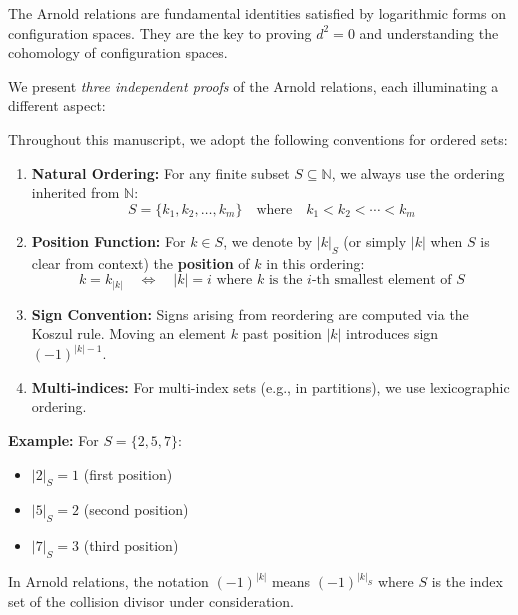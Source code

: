 The Arnold relations are fundamental identities satisfied by logarithmic forms on configuration spaces. They are the key to proving $d^2 = 0$ and understanding the cohomology of configuration spaces.

We present \emph{three independent proofs} of the Arnold relations, each illuminating a different aspect:

\begin{convention}\label{conv:set-ordering-arnold}
Throughout this manuscript, we adopt the following conventions for ordered sets:

\begin{enumerate}
\item \textbf{Natural Ordering:} For any finite subset $S \subseteq \mathbb{N}$, 
we always use the ordering inherited from $\mathbb{N}$:
$$S = \{k_1, k_2, \ldots, k_m\} \quad \text{where} \quad k_1 < k_2 < \cdots < k_m$$

\item \textbf{Position Function:} For $k \in S$, we denote by $|k|_S$ (or simply $|k|$ 
when $S$ is clear from context) the \textbf{position} of $k$ in this ordering:
$$k = k_{|k|} \quad \iff \quad |k| = i \text{ where } k \text{ is the } i\text{-th smallest element of } S$$

\item \textbf{Sign Convention:} Signs arising from reordering are computed via the 
Koszul rule. Moving an element $k$ past position $|k|$ introduces sign $(-1)^{|k|-1}$.

\item \textbf{Multi-indices:} For multi-index sets (e.g., in partitions), we use 
lexicographic ordering.
\end{enumerate}

\textbf{Example:} For $S = \{2, 5, 7\}$:
\begin{itemize}
\item $|2|_S = 1$ (first position)
\item $|5|_S = 2$ (second position)  
\item $|7|_S = 3$ (third position)
\end{itemize}

In Arnold relations, the notation $(-1)^{|k|}$ means $(-1)^{|k|_S}$ where $S$ is the 
index set of the collision divisor under consideration.
\end{convention}

